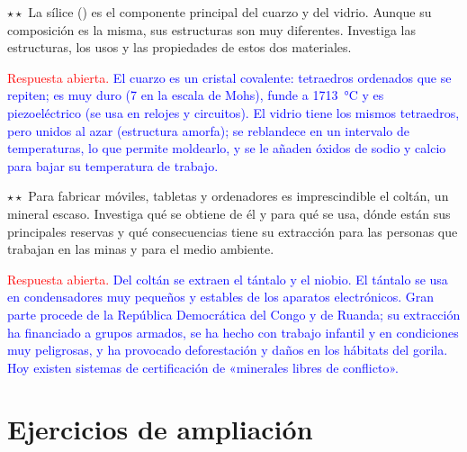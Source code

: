 \begin{exercise}
    \(\star\star\) La sílice () es el componente principal del cuarzo y del vidrio. Aunque su composición es la misma,
    sus estructuras son muy diferentes. Investiga las estructuras, los usos y las propiedades de estos dos materiales.
    \begin{solu}
        \textcolor{red}{Respuesta abierta.} \textcolor{blue}{El cuarzo es un cristal covalente: tetraedros  ordenados que se
        repiten; es muy duro (7 en la escala de Mohs), funde a \qty{1713}{\degreeCelsius} y es piezoeléctrico (se usa en relojes y
        circuitos). El vidrio tiene los mismos tetraedros, pero unidos al azar (estructura amorfa); se reblandece en un intervalo
        de temperaturas, lo que permite moldearlo, y se le añaden óxidos de sodio y calcio para bajar su temperatura de trabajo.}
    \end{solu}
\end{exercise}

\begin{exercise}
    \(\star\star\) Para fabricar móviles, tabletas y ordenadores es imprescindible el coltán, un mineral escaso. Investiga qué
    se obtiene de él y para qué se usa, dónde están sus principales reservas y qué consecuencias tiene su extracción para las
    personas que trabajan en las minas y para el medio ambiente.
    \begin{solu}
        \textcolor{red}{Respuesta abierta.} \textcolor{blue}{Del coltán se extraen el tántalo y el niobio. El tántalo se usa en
        condensadores muy pequeños y estables de los aparatos electrónicos. Gran parte procede de la República Democrática del
        Congo y de Ruanda; su extracción ha financiado a grupos armados, se ha hecho con trabajo infantil y en condiciones muy
        peligrosas, y ha provocado deforestación y daños en los hábitats del gorila. Hoy existen sistemas de certificación de
        «minerales libres de conflicto».}
    \end{solu}
\end{exercise}

\section{Ejercicios de ampliación}\label{sec:ud4-ampliacion}

